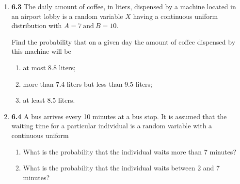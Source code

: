 \documentclass[basic, header]{nosvagor-notes}
\begin{document}
\begin{enumerate}[leftmargin=1.5em, itemsep=4em]
\begin{enumerate}[leftmargin=1.6em]
    \end{enumerate}

  \item \textbf{6.3} The daily amount of coffee, in liters, dispensed by a
    machine located in an airport lobby is a random variable \(X\) having a
    continuous uniform distribution with \(A = 7 ~\text{and}~ B = 10\).

    Find the probability that on a given day the amount of coffee dispensed by
    this machine will be
    \begin{enumerate}[leftmargin=1.6em]

      \item at most 8.8 liters;

      \item more than 7.4 liters but less than 9.5 liters;

      \item at least 8.5 liters.

    \end{enumerate}

  \item \textbf{6.4} A bus arrives every 10 minutes at a bus stop. It is
    assumed that the waiting time for a particular individual is a random
    variable with a continuous uniform
    \begin{enumerate}[leftmargin=1.6em]

      \item What is the probability that the individual waits more than 7
        minutes?

      \item  What is the probability that the individual waits between 2 and 7
        minutes?

    \end{enumerate}

\end{enumerate}
\end{document}
